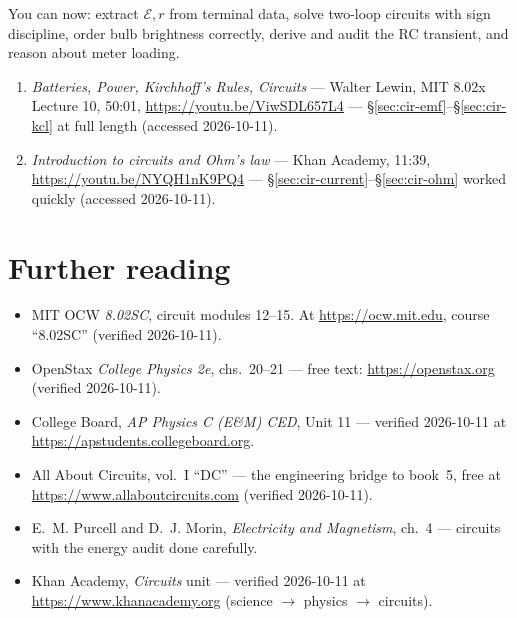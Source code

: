 \begin{wins}
You can now: extract $\mathcal E,r$ from terminal data, solve two-loop
circuits with sign discipline, order bulb brightness correctly, derive
and audit the RC transient, and reason about meter loading.
\end{wins}


\begin{rulebox}
\begin{enumerate}
\item \emph{Batteries, Power, Kirchhoff's Rules, Circuits} --- Walter
Lewin, MIT 8.02x Lecture 10, 50:01, \url{https://youtu.be/ViwSDL657L4}
--- \S\ref{sec:cir-emf}--\S\ref{sec:cir-kcl} at full length (accessed
2026-10-11).
\item \emph{Introduction to circuits and Ohm's law} --- Khan Academy,
11:39, \url{https://youtu.be/NYQH1nK9PQ4} ---
\S\ref{sec:cir-current}--\S\ref{sec:cir-ohm} worked quickly (accessed
2026-10-11).
\end{enumerate}
\end{rulebox}

\section*{Further reading}

\begin{itemize}
\item MIT OCW \emph{8.02SC}, circuit modules 12--15. At
\url{https://ocw.mit.edu}, course ``8.02SC'' (verified 2026-10-11).
\item OpenStax \emph{College Physics 2e}, chs.~20--21 --- free text:
\url{https://openstax.org} (verified 2026-10-11).
\item College Board, \emph{AP Physics C (E\&M) CED}, Unit 11 ---
verified 2026-10-11 at \url{https://apstudents.collegeboard.org}.
\item All About Circuits, vol.~I ``DC'' --- the engineering bridge to
book~5, free at \url{https://www.allaboutcircuits.com} (verified
2026-10-11).
\item E.~M. Purcell and D.~J. Morin, \emph{Electricity and Magnetism},
ch.~4 --- circuits with the energy audit done carefully.
\item Khan Academy, \emph{Circuits} unit ---
verified 2026-10-11 at \url{https://www.khanacademy.org}
(science $\to$ physics $\to$ circuits).
\end{itemize}

